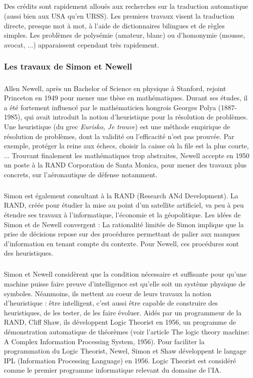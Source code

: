 \subparagraph{}
Des crédits sont rapidement alloués aux recherches sur la traduction automatique (aussi bien aux USA qu'en URSS). Les premiers travaux visent la traduction directe, presque mot à mot, à l'aide de dictionnaires bilingues et de règles simples. Les problèmes de polysémie (amateur, blanc) ou d'homonymie (mousse, avocat, ...) apparaissent cependant très rapidement.                      


\subsubsection{Les travaux de Simon et Newell}

\subparagraph{}
Allen Newell, après un Bachelor of Science en physique à Stanford, rejoint Princeton en 1949 pour mener une thèse en mathématiques. Durant ses études, il a été fortement influencé par le mathématicien hongrois Georges Polya (1887-1985), qui avait introduit la notion d'heuristique pour la résolution de problèmes. Une heuristique (du grec \textit{Eurisko, Je trouve}) est une méthode empirique de résolution de problèmes, dont la validité ou l'efficacité n'est pas prouvée. Par exemple, protéger la reine aux échecs, choisir la caisse où la file est la plus courte, ...
Trouvant finalement les mathématiques trop abstraites, Newell accepte en 1950 un poste à la RAND Corporation de Santa Monica, pour mener des travaux plus concrets, sur l'aéronautique de défense notamment.

\subparagraph{}
Simon est également consultant à la RAND (Research ANd Development). La RAND, créée pour étudier la mise au point d'un satellite artificiel, va peu à peu étendre ses travaux à l'informatique, l'économie et la géopolitique. Les idées de Simon et de Newell convergent : La rationalité limitée de Simon implique que la prise de décisions repose sur des procédures permettant de palier aux manques d'information en tenant compte du contexte. Pour Newell, ces procédures sont des heuristiques.

\subparagraph{}
Simon et Newell considèrent que la condition nécessaire et suffisante pour qu'une machine puisse faire preuve d'intelligence est qu'elle soit un système physique de symboles.
Néanmoins, ils mettent au coeur de leurs travaux la notion d'heuristique : être intelligent, c'est aussi être capable de construire des heuristiques, de les tester, de les faire évoluer. Aidés par un programmeur de la RAND, Cliff Shaw, ils développent Logic Theorist en 1956, un programme de démonstration automatique de théorèmes (voir l'article The logic theory machine: A Complex Information Processing System, 1956). Pour faciliter la programmation du Logic Theorist, Newel, Simon et Shaw développent le langage IPL (Information Processing Language) en 1956.
Logic Theorist est considéré comme le premier programme informatique relevant du domaine de l'IA.

